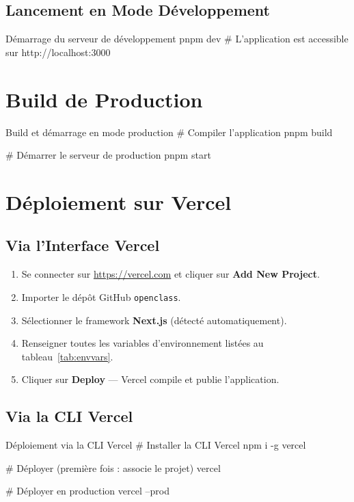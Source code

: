 \documentclass[12pt, a4paper, twoside]{report}
\begin{document}
\subsection{Lancement en Mode Développement}

\begin{codesnap}[bash]{Démarrage du serveur de développement}
pnpm dev
# L'application est accessible sur http://localhost:3000
\end{codesnap}

\section{Build de Production}

\begin{codesnap}[bash]{Build et démarrage en mode production}
# Compiler l'application
pnpm build

# Démarrer le serveur de production
pnpm start
\end{codesnap}

\section{Déploiement sur Vercel}

\subsection{Via l'Interface Vercel}

\begin{enumerate}
  \item Se connecter sur \url{https://vercel.com} et cliquer sur \textbf{Add New Project}.
  \item Importer le dépôt GitHub \texttt{openclass}.
  \item Sélectionner le framework \textbf{Next.js} (détecté automatiquement).
  \item Renseigner toutes les variables d'environnement listées au tableau~\ref{tab:envvars}.
  \item Cliquer sur \textbf{Deploy} — Vercel compile et publie l'application.
\end{enumerate}

\subsection{Via la CLI Vercel}

\begin{codesnap}[bash]{Déploiement via la CLI Vercel}
# Installer la CLI Vercel
npm i -g vercel

# Déployer (première fois : associe le projet)
vercel

# Déployer en production
vercel --prod
\end{codesnap}
\end{document}

